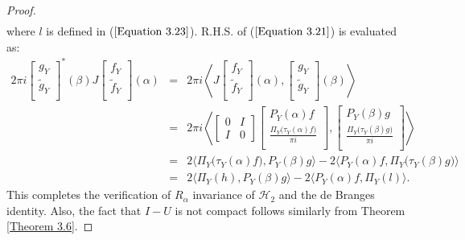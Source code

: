 \documentclass [12pt,reqno]{amsart}
\numberwithin{equation}{subsection}
\numberwithin{equation}{section}
\begin{document}
\begin{proof}
\begin{eqnarray*}
\end{eqnarray*}
where $l$ is defined in ($\ref{Equation 3.23}$). R.H.S. of ($\ref{Equation 3.21}$) is evaluated as: \begin{eqnarray*}
2\pi i  \begin{bmatrix} 
	g_Y  \\
	\tilde{g}_Y \\
	\end{bmatrix}^*(\beta) J  \begin{bmatrix} 
	f_Y  \\
	\tilde{f}_Y \\
	\end{bmatrix}(\alpha) 
&=& 2\pi i  \left\langle J \begin{bmatrix} 
	f_Y  \\
	\tilde{f}_Y \\
	\end{bmatrix}(\alpha) ,  \begin{bmatrix} 
	g_Y  \\
	\tilde{g}_Y \\
	\end{bmatrix}(\beta) \right\rangle \\
&=&	 2 \pi i  \left\langle  \begin{bmatrix}
0 & I \\ 
I & 0
\end{bmatrix} 
\begin{bmatrix} 
	P_Y(\alpha)f  \\
	\frac{\Pi_{Y} \bigl(\tau_Y(\alpha)f \bigl)}{\pi i} \\
	\end{bmatrix} ,  \begin{bmatrix} 
	P_Y(\beta)g  \\
	\frac{\Pi_{Y}\bigl(\tau_Y(\beta)g\bigl)}{\pi i} \\
	\end{bmatrix} \right\rangle \\
&=& 2\langle \Pi_{Y}\bigl(\tau_Y(\alpha)f \bigl) ,P_Y(\beta)g \rangle - 2 \langle P_Y(\alpha)f,\Pi_{Y}\bigl(\tau_Y(\beta)g \bigl) \rangle\\
&=& 2\langle \Pi_{Y}(h) ,P_Y(\beta)g \rangle - 2 \langle P_Y(\alpha)f,\Pi_{Y}(l) \rangle.
\end{eqnarray*}
This completes the verification of $R_\alpha$ invariance of $\mathcal{H}_2$ and the de Branges identity. Also, the fact that $I-U$ is not compact follows similarly from Theorem \ref{Theorem 3.6}.
\end{proof}
\end{document}

